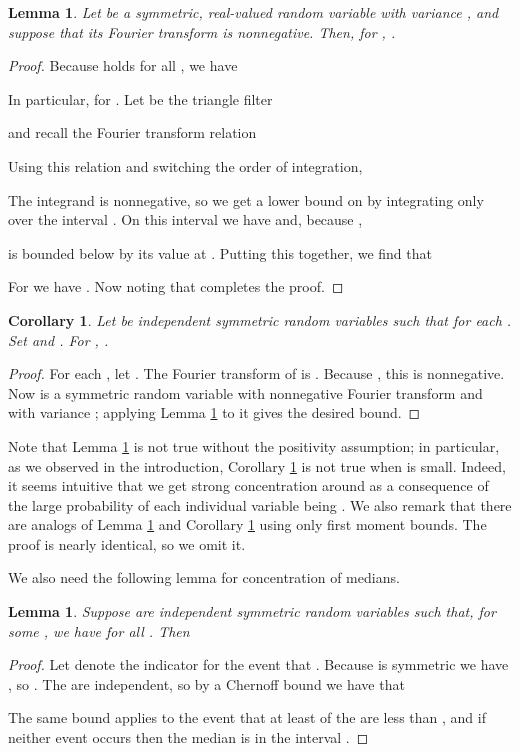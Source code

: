 \documentclass[letterpaper,11pt]{article}
\newtheorem{lemma}[theorem]{Lemma}
\newtheorem{corollary}[theorem]{Corollary}
\begin{document}
\begin{lemma}\label{lemma:gen}
  Let  be a symmetric, real-valued random variable
  with variance , and suppose that its Fourier transform  is nonnegative.
  Then, for , .
\end{lemma}
\begin{proof}
Because  holds for all ,
we have

In particular,  for .
Let  be the triangle filter

and recall the Fourier transform relation

Using this relation and switching the order of integration,

The integrand is nonnegative, so we get a lower bound on 
by integrating only over the interval .  On this
interval we have  and,
because ,

is bounded below by its
value at .  Putting this together, we find that

For  we have .
Now noting that  completes
the proof.
\end{proof}

\begin{corollary} \label{cor:gen}
Let  be independent symmetric random variables such that
 for each .
Set  and .
For , .
\end{corollary}
\begin{proof}
For each , let .  The
Fourier transform of  is
.
Because , this is nonnegative.  Now  is a symmetric random
variable with nonnegative Fourier transform  and
with variance ; applying Lemma \ref{lemma:gen}
to it gives the desired bound.
\end{proof}



Note that Lemma \ref{lemma:gen} is not true without the
positivity assumption; in particular, as we observed in the
introduction, Corollary \ref{cor:gen} is not true when
 is small.  Indeed, it seems
intuitive that we get strong concentration
around  as a consequence of the large probability of each individual
variable being .  We also remark that there are analogs of Lemma
\ref{lemma:gen} and Corollary \ref{cor:gen} using only first moment
bounds.  The proof is nearly identical, so we omit it.

We also need the following lemma for concentration of medians.

\begin{lemma}\label{lemma:medians}
  Suppose  are independent symmetric random variables such
  that, for some , we have
   for all .  Then
  
\end{lemma}
\begin{proof}
  Let  denote the indicator for the event that .
  Because  is symmetric we have
  , so .
  The  are independent, so by a Chernoff bound we have that
  
  The same bound applies to the event that at least  of the 
  are less than , and if neither event occurs then the median is in
  the interval .
\end{proof}
\end{document}
